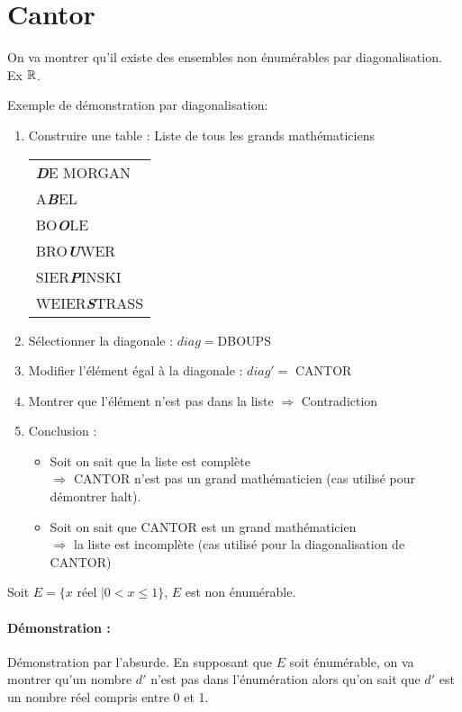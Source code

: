 \section{Cantor}
\label{sec:cantor}
On va montrer qu'il existe des ensembles non énumérables par diagonalisation. Ex $\mathbb{R}$.
\begin{myexem}
	Exemple de démonstration par diagonalisation:
	\begin{enumerate}
		\item Construire une table : Liste de tous les grands
			mathématiciens \\
			\begin{tabular}{l}
				\textit{\textbf{D}}E MORGAN \\
				A\textit{\textbf{B}}EL\\
				BO\textit{\textbf{O}}LE\\
				BRO\textit{\textbf{U}}WER\\
				SIER\textit{\textbf{P}}INSKI\\
				WEIER\textit{\textbf{S}}TRASS\\
			\end{tabular}
		\item Sélectionner la diagonale : $diag = $DBOUPS
		\item Modifier l'élément égal à la diagonale : $diag' =$ CANTOR
		\item Montrer que l'élément n'est pas dans la liste $\Rightarrow$ Contradiction
		\item Conclusion :
			\begin{itemize}
				\item Soit on sait que la liste est complète\\
					$ \Rightarrow$ CANTOR n'est pas un grand
				mathématicien (cas utilisé pour démontrer
				halt).
				\item Soit on sait que CANTOR est un grand
					mathématicien \\
					$ \Rightarrow$ la liste est incomplète
				(cas utilisé pour la diagonalisation de CANTOR)
			\end{itemize}
	\end{enumerate}
\end{myexem}

\begin{mytheo}
	Soit $E = \{ x \text{ réel }| 0<x\leq1\}$, $E$ est non énumérable.
\end{mytheo}

\paragraph{Démonstration :}
Démonstration par l'absurde.  En supposant que $E$ soit énumérable, on va montrer qu'un nombre $d'$ n'est pas dans l'énumération alors qu'on sait
que $d'$ est un nombre réel compris entre 0 et 1.

